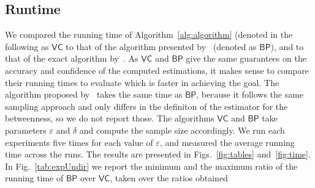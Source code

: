 \subsection{Runtime}\label{sec:runtime}
We compared the running time of Algorithm~\ref{alg:algorithm} (denoted in the
following as $\mathsf{VC}$ to that of the algorithm presented
by~\citet{JacobKLPT05,BrandesP07,GeisbergerSS08}
(denoted as $\mathsf{BP}$), and to that of the exact
algorithm by~\citet{Brandes01}. As $\mathsf{VC}$ and $\mathsf{BP}$ give the same
guarantees on the accuracy and confidence of the computed estimations, it makes
sense to compare their running times to evaluate which is faster in achieving
the goal. The algorithm proposed by~\citet{GeisbergerSS08}
takes the same time as $\mathsf{BP}$, because it follows the same sampling
approach and only differs in the definiton of the estimator for the betweenness,
so we do not report those.
The algorithms $\mathsf{VC}$ and $\mathsf{BP}$ take parameters $\varepsilon$ and
$\delta$ and compute the sample size accordingly. 
 We run each experiments five times for each value of $\varepsilon$, and
measured the average running time across the runs.
The results are presented in Figs.~\ref{fig:tables} 
and~\ref{fig:time}. 
%
In Fig.~\ref{tab:expUndir} we report the minimum and the maximum ratio of the
running time of $\mathsf{BP}$ over $\mathsf{VC}$, taken over the ratios obtained
